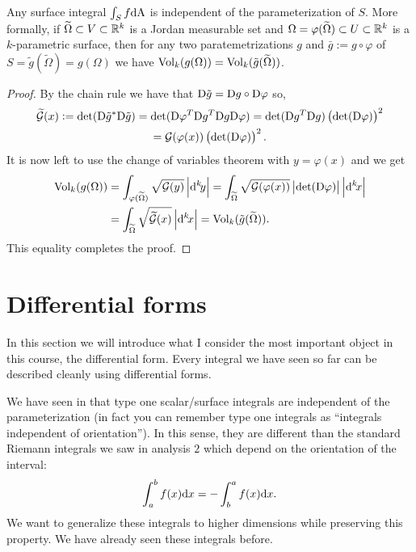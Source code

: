 \documentclass[11pt,a4paper]{article}
\begin{document}
\begin{proposition}
  \label{prop:surface-area-scalar-field-free-of-parameterization}
  Any surface integral $\int_{S} f \mathrm{d} \mathrm{A}$ is independent of the parameterization
  of $S$.
  More formally, if $\widetilde \Omega \subset V \subset \mathbb{R}^k$ is
  a Jordan measurable set
  and $\Omega = \varphi(\widetilde \Omega) \subset U \subset \mathbb{R}^k$
  is a $k$-parametric surface,
  then for any two paratemetrizations $g$ and $\bar g := g \circ \varphi$
  of $S = \tilde g(\widetilde \Omega) = g(\Omega)$ we have
  $\operatorname{Vol}_k(g(\Omega)) = \operatorname{Vol}_k(\tilde g(\widetilde \Omega))$.
\end{proposition}
\begin{proof}
  By the chain rule we have that
  $\mathrm{D} \tilde g = \mathrm{D} g \circ \mathrm{D} \varphi$ so,
  \begin{multline*}
    \widetilde{\mathcal G}(x) :=
    \det(\Dif \tilde g^* \Dif \tilde g) =
    \det(\Dif \varphi^T \Dif g^T \Dif g \Dif \varphi) =
    \det(\Dif g^T \Dif g) \del{\det(\Dif \varphi)}^2 \\ =
    \mathcal G(\varphi(x)) \del{\det(\Dif \varphi)}^2.
  \end{multline*}
  It is now left to use the change of variables theorem
  with $y = \varphi(x)$ and we get
  \begin{align*}
    \Vol_k(g(\Omega)) &=
    \int_{\varphi(\widetilde \Omega)} \sqrt{\mathcal G(y)} \abs{\dy[k]} =
    \int_{\widetilde \Omega}
    \sqrt{\mathcal G(\varphi(x))} \abs{\det(\Dif \varphi)} \abs{\dx[k]} \\&=
    \int_{\widetilde \Omega} \sqrt{\widetilde{\mathcal G}(x)} \abs{\dx[k]} =
    \Vol_k(\tilde g(\widetilde \Omega)).
  \end{align*}
  This equality completes the proof.
\end{proof}


\newpage

\section{Differential forms}
\begin{remark}
  In this section we will introduce what I consider
  the most important object in this course,
  the differential form.
  Every integral we have seen so far can be described cleanly using
  differential forms.
\end{remark}

We have seen in 
that type one scalar/surface integrals are independent of the parameterization
(in fact you can remember type one integrals as
``integrals independent of orientation'').
In this sense, they are different than the standard Riemann integrals we
saw in analysis $2$ which depend on the orientation of the interval:
\[
    \int_{a}^{b} f(x) \dx =
    - \int_{b}^{a} f(x) \dx.
\]
We want to generalize these integrals to higher dimensions
while preserving this property.
We have already seen these integrals before.
\end{document}
